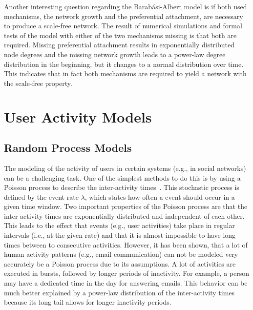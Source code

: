 Another interesting question regarding the Barabási-Albert model is if both used mechanisms, the network growth and the preferential attachment, are necessary to produce a scale-free network.
The result of numerical simulations and formal tests of the model with either of the two mechanisms missing is that both are required.
Missing preferential attachment results in exponentially distributed node degrees and the missing network growth leads to a power-law degree distribution in the beginning, but it changes to a normal distribution over time.
This indicates that in fact both mechanisms are required to yield a network with the scale-free property.




\section{User Activity Models}

\subsection{Random Process Models}

The modeling of the activity of users in certain systems (e.g., in social networks) can be a challenging task.
One of the simplest methods to do this is by using a Poisson process to describe the inter-activity times~\cite{Masuda2016, Vazquez2006}.
This stochastic process is defined by the event rate \(\lambda\), which states how often a event should occur in a given time window.
Two important properties of the Poisson process are that the inter-activity times are exponentially distributed and independent of each other.
This leads to the effect that events (e.g., user activities) take place in regular intervals (i.e., at the given rate) and that it is almost impossible to have long times between to consecutive activities.
However, it has been shown, that a lot of human activity patterns (e.g., email communication) can not be modeled very accurately be a Poisson process due to its assumptions.
A lot of activities are executed in bursts, followed by longer periods of inactivity.
For example, a person may have a dedicated time in the day for answering emails.
This behavior can be much better explained by a power-law distribution of the inter-activity times because its long tail allows for longer inactivity periods.


